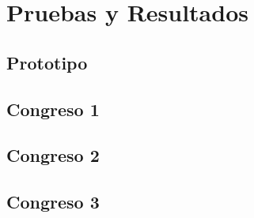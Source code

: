 \chapter{Pruebas y Resultados}

\section{Prototipo}

\section{Congreso 1}

\section{Congreso 2}

\section{Congreso 3}
